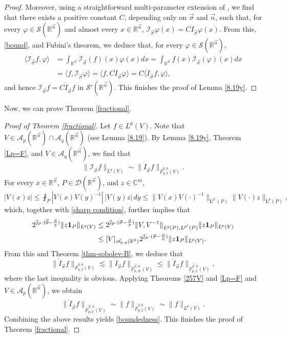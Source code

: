 \documentclass[11pt, reqno]{amsart}
\theoremstyle{definition}
\theoremstyle{remark}
\numberwithin{equation}{section}
\newcommand{\A}{\mathscr A}
\newcommand{\C}{\mathbb C}
\newcommand{\R}{\mathbb R}
\newcommand{\vj}{\vec{\textit{\j}}}
\newcommand{\vn}{\vec n}
\newcommand{\aveL}{\textit{\L}}
\newcommand{\Norm}[2]{\|#1\|_{#2}}
\begin{document}
\begin{proof}
Moreover, using a straightforward multi-parameter
extension of \cite[p.\,88]{Duo},
we find that there exists a positive constant $C$,
depending only on $\vec \sigma$ and $\vec n$, such that,
for every $\varphi\in \mathscr S(\R^{\vn})$ and almost every
$x\in\R^{\vn}$,
$\mathscr I_{\vec\sigma} \varphi(x)=C\dot I_{\vec\sigma} \varphi(x)$.
From this, \eqref{bound}, and Fubini's theorem,
we deduce that,
for every $\varphi\in \mathscr S(\R^{\vn})$,
\begin{align*}
\langle \mathscr I_{\vec\sigma} f, \varphi \rangle
&=\int_{\mathbb R^{\vec n}} \mathscr I_{\vec\sigma} (f)(x) \varphi(x) dx
= \int_{\mathbb R^{\vec n}} f(x) \mathscr I_{\vec\sigma} (\varphi)(x) dx \\
&= \langle f, \mathscr I_{\vec\sigma} \varphi \rangle
= \langle f, C \dot I_{\vec\sigma} \varphi \rangle
= C \langle \dot I_{\vec\sigma} f, \varphi \rangle,
\end{align*}
and hence $\mathscr I_{\vec\sigma} f= C \dot I_{\vec\sigma} f$
in $\mathscr S'(\R^{\vn})$. This finishes the proof of Lemma \ref{8.19y}.
\end{proof}

Now, we can prove Theorem \ref{fractional}.

\begin{proof}[Proof of Theorem \ref{fractional}]
Let $f\in L^p(V)$.
Note that $V\in \A_p(\R^{\vn}) \cap \A_q(\R^{\vn})$ (see Lemma \ref{8.19}).
By Lemma \ref{8.19y}, Theorem \ref{Lp=F}, and $V\in \A_q(\R^{\vn})$, we find that
$$
\|\mathscr I_{\vec\sigma} f\|_{L^{q}(V)}
\sim\Norm{\dot I_{\vec\sigma} f}{\dot F^{0,0}_{q,2}(V)}.
$$
For every $x\in\mathbb R^{\vec n}$,
$P\in\mathscr D(\mathbb R^{\vec n})$, and $z\in\C^m$,
$$
|V(x)z|\leq \fint_P |V(x)V(y)^{-1}|\, |V(y)z| \, dy
\leq \|V(x)V(\cdot)^{-1}\|_{\aveL^{p'}(P)} \|V(\cdot)z\|_{\aveL^{p}(P)},
$$
which, together with \eqref{sharp condition}, further implies that
\begin{align*}
2^{\vj_P \cdot (\vec 0-\frac{\vec n}{q})}\|z\mathbf 1_P\|_{\aveL^{q}(V)}
&\leq 2^{\vj_P \cdot (\vec \sigma-\frac{\vec n}{p})}\|V,V^{-1}\|_{\aveL^{q}(P),\aveL^{p'}(P)}
\|z\mathbf 1_P\|_{\aveL^{p}(V)}\\
&\leq [V]_{\A_{p,q}(\mathbb R^{\vec n})}
2^{\vj_P \cdot (\vec \sigma-\frac{\vec n}{p})}
\|z\mathbf 1_P\|_{\aveL^{p}(V)}.
\end{align*}
From this and Theorem \ref{thm-sobolev-B}, we deduce that
$$
\Norm{\dot I_{\vec\sigma} f}{\dot F^{0,0}_{q,2}(V)}
\lesssim\Norm{\dot I_{\vec\sigma} f}{\dot F^{\vec\sigma,0}_{p,\infty}(V)}
\leq\Norm{\dot I_{\vec\sigma} f}{\dot F^{\vec\sigma,0}_{p,2}(V)},
$$
where the last inequality is obvious.
Applying Theorems \ref{257V} and \ref{Lp=F} and $V\in \A_p(\R^{\vn})$, we obtain
$$
\Norm{\dot I_{\vec\sigma} f}{\dot F^{\vec\sigma,0}_{p,2}(V)}
\sim\Norm{f}{\dot F^{0,0}_{p,2}(V)}
\sim\|f\|_{L^p(V)}.
$$
Combining the above results yields \eqref{boundedness}.
This finishes the proof of Theorem \ref{fractional}.
\end{proof}
\end{document}
